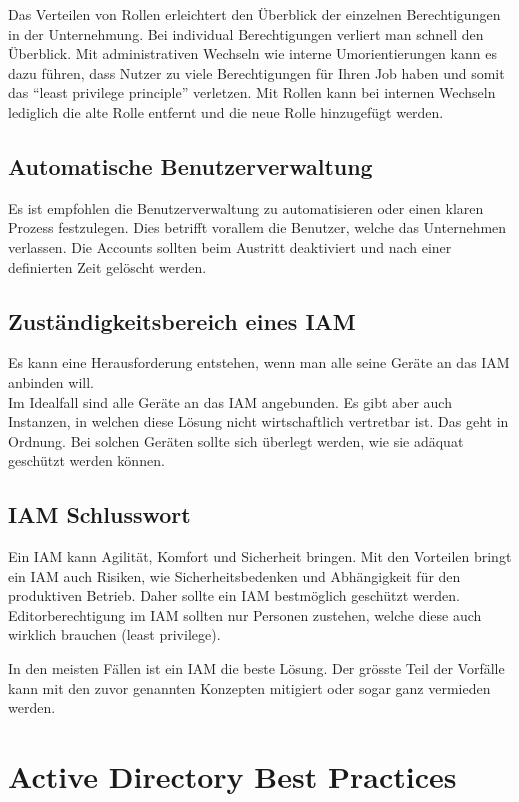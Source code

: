Das Verteilen von Rollen erleichtert den Überblick der einzelnen Berechtigungen in der Unternehmung.
Bei individual Berechtigungen verliert man schnell den Überblick.
Mit administrativen Wechseln wie interne Umorientierungen kann es dazu führen, dass Nutzer zu viele Berechtigungen für Ihren Job haben und somit das ``least privilege principle'' verletzen.
Mit Rollen kann bei internen Wechseln lediglich die alte Rolle entfernt und die neue Rolle hinzugefügt werden.


\subsection{Automatische Benutzerverwaltung}
Es ist empfohlen die Benutzerverwaltung zu automatisieren oder einen klaren Prozess festzulegen.
Dies betrifft vorallem die Benutzer, welche das Unternehmen verlassen.
Die Accounts sollten beim Austritt deaktiviert und nach einer definierten Zeit gelöscht werden.


\subsection{Zuständigkeitsbereich eines IAM}
Es kann eine Herausforderung entstehen, wenn man alle seine Geräte an das IAM anbinden will.\\

Im Idealfall sind alle Geräte an das IAM angebunden.
Es gibt aber auch Instanzen, in welchen diese Lösung nicht wirtschaftlich vertretbar ist.
Das geht in Ordnung.
Bei solchen Geräten sollte sich überlegt werden, wie sie adäquat geschützt werden können.

\subsection{IAM Schlusswort}
Ein IAM kann Agilität, Komfort und Sicherheit bringen.
Mit den Vorteilen bringt ein IAM auch Risiken, wie Sicherheitsbedenken und Abhängigkeit für den produktiven Betrieb.
Daher sollte ein IAM bestmöglich geschützt werden.
Editorberechtigung im IAM sollten nur Personen zustehen, welche diese auch wirklich brauchen (least privilege).

In den meisten Fällen ist ein IAM die beste Lösung.
Der grösste Teil der Vorfälle kann mit den zuvor genannten Konzepten mitigiert oder sogar ganz vermieden werden.


\section{Active Directory Best Practices}
